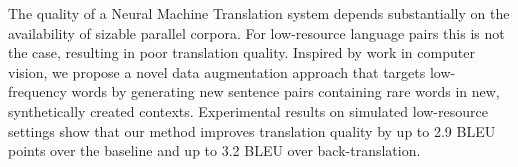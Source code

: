 The quality of a Neural Machine Translation system depends substantially on the availability of sizable parallel corpora. For low-resource language pairs this is not the case, resulting in poor translation quality. Inspired by work in computer vision, we propose a novel data augmentation approach that targets low-frequency words by generating new sentence pairs containing rare words in new, synthetically created contexts. Experimental results on simulated low-resource settings show that our method improves translation quality by up to 2.9 BLEU points over the baseline and up to 3.2 BLEU over back-translation.
